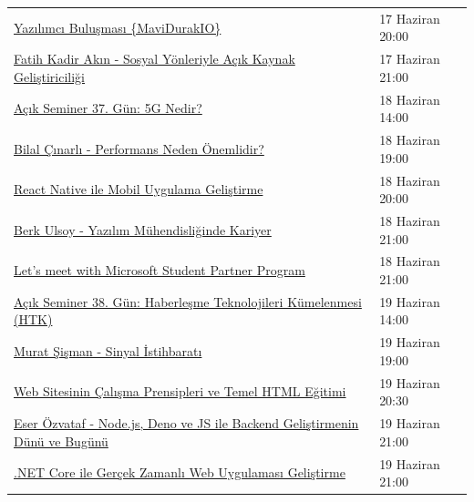 \documentclass[11pt]{article}
\begin{document}
\begin{longtable}{|p{9.5cm}|l|}
\href{https://kommunity.com/mavidurakio/events/s1e47-yazilimci-bulusmasi-13124b44}{Yazılımcı Buluşması \{MaviDurakIO\}} & 17 Haziran 20:00\\
\href{https://kommunity.com/acmhacettepe/events/sosyal-yonleriyle-acik-kaynak-gelistiriciligi-fatih-kadir-akin-acsdays-6-4ce6fd17}{Fatih Kadir Akın - Sosyal Yönleriyle Açık Kaynak Geliştiriciliği} & 17 Haziran 21:00\\
\href{https://kommunity.com/tracikkaynak/events/acik-seminer-37-gun-3b11c4ed}{Açık Seminer 37. Gün: 5G Nedir?} & 18 Haziran 14:00\\
\href{https://kommunity.com/acmhacettepe/events/performans-neden-onemlidir-bilal-cinarli-acsdays-7-6bdfb155}{Bilal Çınarlı - Performans Neden Önemlidir?} & 18 Haziran 19:00\\
\href{https://kommunity.com/bilge-adam-teknoloji/events/react-native-ile-mobil-uygulama-gelistirme-245c083b}{React Native ile Mobil Uygulama Geliştirme} & 18 Haziran 20:00\\
\href{https://kommunity.com/acmhacettepe/events/yazilim-muhendisliginde-kariyer-harita-arazinin-kendisi-degil-berk-ulsoy-fe3c6d29}{Berk Ulsoy - Yazılım Mühendisliğinde Kariyer} & 18 Haziran 21:00\\
\href{https://kommunity.com/microsoft-student-partners-turkiye/events/lets-meet-with-microsoft-student-partner-ae6f043f}{Let's meet with Microsoft Student Partner Program} & 18 Haziran 21:00\\
\href{https://kommunity.com/tracikkaynak/events/acik-seminer-38-gun-9d1b528b}{Açık Seminer 38. Gün: Haberleşme Teknolojileri Kümelenmesi (HTK)} & 19 Haziran 14:00\\
\href{https://kommunity.com/acmhacettepe/events/sinyal-istihbarati-murat-sisman-acsdays-9-cb66ab0b}{Murat Şişman - Sinyal İstihbaratı} & 19 Haziran 19:00\\
\href{https://kommunity.com/kare-disket/events/web-sitesinin-calisma-prensipleri-ve-temel-html-egitimi-660e1e14}{Web Sitesinin Çalışma Prensipleri ve Temel HTML Eğitimi} & 19 Haziran 20:30\\
\href{https://kommunity.com/acmhacettepe/events/nodejs-deno-ve-js-ile-backend-gelistirmenin-dunu-ve-bugunu-eser-ozvataf-5ef2730a}{Eser Özvataf - Node.js, Deno ve JS ile Backend Geliştirmenin Dünü ve Bugünü} & 19 Haziran 21:00\\
\href{https://kommunity.com/bilge-adam-teknoloji/events/net-core-ile-gercek-zamanli-web-uygulamasi-gelistirme-305ed24d}{.NET Core ile Gerçek Zamanlı Web Uygulaması Geliştirme} & 19 Haziran 21:00\\

\end{longtable}
\end{document}
